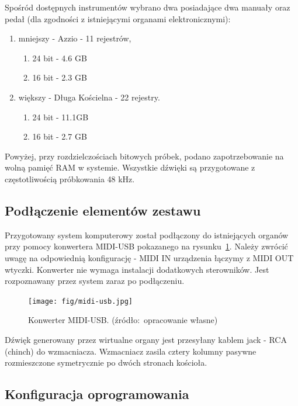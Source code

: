 \documentclass[11pt]{report}
\begin{document}
    Spośród dostępnych instrumentów wybrano dwa posiadające dwa manuały oraz pedał (dla zgodności z istniejącymi organami elektronicznymi):
    \begin{enumerate}
        \item mniejszy - Azzio - 11 rejestrów,
        \begin{enumerate}
            \item 24 bit - 4.6 GB
            \item 16 bit - 2.3 GB
        \end{enumerate}
        \item większy - Długa Kościelna - 22 rejestry.
        \begin{enumerate}
            \item 24 bit - 11.1GB
            \item 16 bit - 2.7 GB
        \end{enumerate}
    \end{enumerate}
    Powyżej, przy rozdzielczościach bitowych próbek, podano zapotrzebowanie na wolną pamięć RAM w systemie.
    Wszystkie dźwięki są przygotowane z częstotliwością próbkowania 48 kHz.

    \subsection{Podłączenie elementów zestawu}
    Przygotowany system komputerowy został podłączony do istniejących organów przy pomocy konwertera MIDI-USB pokazanego na rysunku~\ref{fig:midiusb}.
    Należy zwrócić uwagę na odpowiednią konfigurację - MIDI IN urządzenia łączymy z MIDI OUT wtyczki.
    Konwerter nie wymaga instalacji dodatkowych sterowników.
    Jest rozpoznawany przez system zaraz po podłączeniu.

    \begin{figure}[!htp]
        \centering
        \texttt{[image: fig/midi-usb.jpg]}
        \caption{Konwerter MIDI-USB. (źródło:~opracowanie własne)}
        \label{fig:midiusb}
    \end{figure}

    Dźwięk generowany przez wirtualne organy jest przesyłany kablem jack - RCA (chinch) do wzmacniacza.
    Wzmacniacz zasila cztery kolumny pasywne rozmieszczone symetrycznie po dwóch stronach kościoła.

    \subsection{Konfiguracja oprogramowania}
\end{document}

